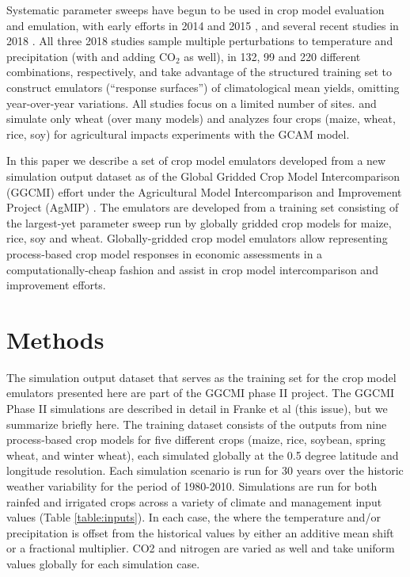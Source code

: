 \documentclass[gmd, manuscript]{copernicus} %
\begin{document}
Systematic parameter sweeps have begun to be used in crop model evaluation and emulation, with early efforts in 2014 and 2015 \citep{ruane2014, Markowski2015, Pirttioja2015}, and several recent studies in 2018 \citep{FRONZEK20182, Snyder2018, RUIZRAMOS2018}. 
All three 2018 studies sample multiple perturbations to temperature and precipitation (with \citet{Snyder2018} and \citet{RUIZRAMOS2018} adding CO$_2$ as well), in 132, 99 and 220 different combinations, respectively, and take advantage of the structured training set to construct emulators (``response surfaces'') of climatological mean yields, omitting year-over-year variations. 
All studies focus on a limited number of sites.
\citet{FRONZEK20182} and \citet{RUIZRAMOS2018} simulate only wheat (over many models) and \citet{Snyder2018} analyzes four crops (maize, wheat, rice, soy) for agricultural impacts experiments with the GCAM \citep{calvin2019} model.

In this paper we describe a set of crop model emulators developed from a new simulation output dataset as of the Global Gridded Crop Model Intercomparison (GGCMI) effort under the Agricultural Model Intercomparison and Improvement Project (AgMIP) \citep{ROSENZWEIG2013, Rosenzweig2014}. 
The emulators are developed from a training set consisting of the largest-yet parameter sweep run by globally gridded crop models for maize, rice, soy and wheat.
Globally-gridded crop model emulators allow representing process-based crop model responses in economic assessments in a computationally-cheap fashion and assist in crop model intercomparison and improvement efforts.


\section{Methods}
\label{S:2}
The simulation output dataset that serves as the training set for the crop model emulators presented here are part of the GGCMI phase II project.
The GGCMI Phase II simulations are described in detail in Franke et al (this issue), but we summarize briefly here.
The training dataset consists of the outputs from nine process-based crop models for five different crops (maize, rice, soybean, spring wheat, and winter wheat), each simulated globally at the 0.5 degree latitude and longitude resolution. 
Each simulation scenario is run for 30 years over the historic weather variability for the period of 1980-2010. 
Simulations are run for both rainfed and irrigated crops across a variety of climate and management input values (Table \ref{table:inputs}). 
In each case, the where the temperature and/or precipitation is offset from the historical values by either an additive mean shift or a fractional multiplier.
CO2 and nitrogen are varied as well and take uniform values globally for each simulation case. 
\end{document}
